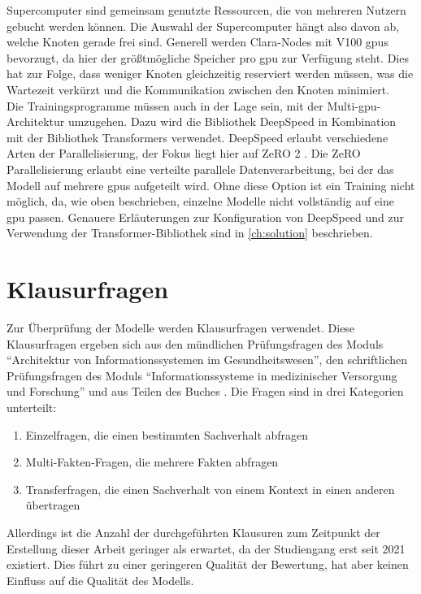 Supercomputer sind gemeinsam genutzte Ressourcen, die von mehreren Nutzern gebucht werden können.
Die Auswahl der Supercomputer hängt also davon ab, welche Knoten gerade frei sind.
Generell werden Clara-Nodes mit V100 \ac{gpu}s bevorzugt, da hier der größtmögliche Speicher pro \ac{gpu} zur Verfügung steht.
Dies hat zur Folge, dass weniger Knoten gleichzeitig reserviert werden müssen, was die Wartezeit verkürzt und die Kommunikation zwischen den Knoten minimiert.\\

Die Trainingsprogramme müssen auch in der Lage sein, mit der Multi-\ac{gpu}-Architektur umzugehen.
Dazu wird die Bibliothek DeepSpeed \citep{deepspeed} in Kombination mit der Bibliothek Transformers verwendet.
DeepSpeed erlaubt verschiedene Arten der Parallelisierung, der Fokus liegt hier auf ZeRO 2 \citep{ZeRO}.
Die ZeRO Parallelisierung erlaubt eine verteilte parallele Datenverarbeitung, bei der das Modell auf mehrere \ac{gpu}s aufgeteilt wird.
Ohne diese Option ist ein Training nicht möglich, da, wie oben beschrieben, einzelne Modelle nicht vollständig auf eine \ac{gpu} passen.
Genauere Erläuterungen zur Konfiguration von DeepSpeed und zur Verwendung der Transformer-Bibliothek sind in \cref{ch:solution} beschrieben.

\section{Klausurfragen}\label{sec:approach:questions}
Zur Überprüfung der Modelle werden Klausurfragen verwendet.
Diese Klausurfragen ergeben sich aus den mündlichen Prüfungsfragen des Moduls \enquote{Architektur von Informationssystemen im Gesundheitswesen},
den schriftlichen Prüfungsfragen des Moduls \enquote{Informationssysteme in medizinischer Versorgung und Forschung} und aus Teilen des Buches \citet{bb}.
Die Fragen sind in drei Kategorien unterteilt:
\begin{enumerate}
    \item Einzelfragen, die einen bestimmten Sachverhalt abfragen
    \item Multi-Fakten-Fragen, die mehrere Fakten abfragen
    \item Transferfragen, die einen Sachverhalt von einem Kontext in einen anderen übertragen
\end{enumerate}

Allerdings ist die Anzahl der durchgeführten Klausuren zum Zeitpunkt der Erstellung dieser Arbeit geringer als erwartet, da der Studiengang erst seit 2021 existiert.
Dies führt zu einer geringeren Qualität der Bewertung,
hat aber keinen Einfluss auf die Qualität des Modells.\\

